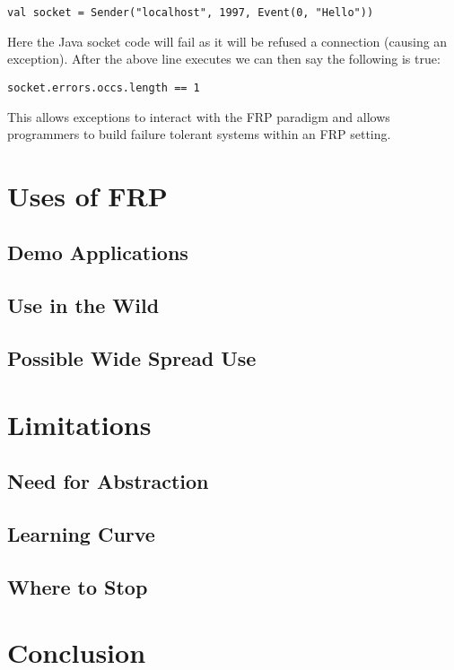 \documentclass[12pt]{article}
\begin{document}
\begin{verbatim}
val socket = Sender("localhost", 1997, Event(0, "Hello")) 
\end{verbatim}

    Here the Java socket code will fail as it will be refused a connection (causing an exception). After the above line 
    executes we can then say the following is true:

\begin{verbatim}
socket.errors.occs.length == 1 
\end{verbatim}

    This allows exceptions to interact with the FRP paradigm and allows programmers to build failure tolerant systems within 
    an FRP setting.
    
  \section{Uses of FRP}
  
    \subsection{Demo Applications}
    
    \subsection{Use in the Wild}
    
    \subsection{Possible Wide Spread Use}
    
  \section{Limitations}
    
    \subsection{Need for Abstraction}
      
    \subsection{Learning Curve}
    
    \subsection{Where to Stop}
      
  \section{Conclusion}
  
\end{document}
